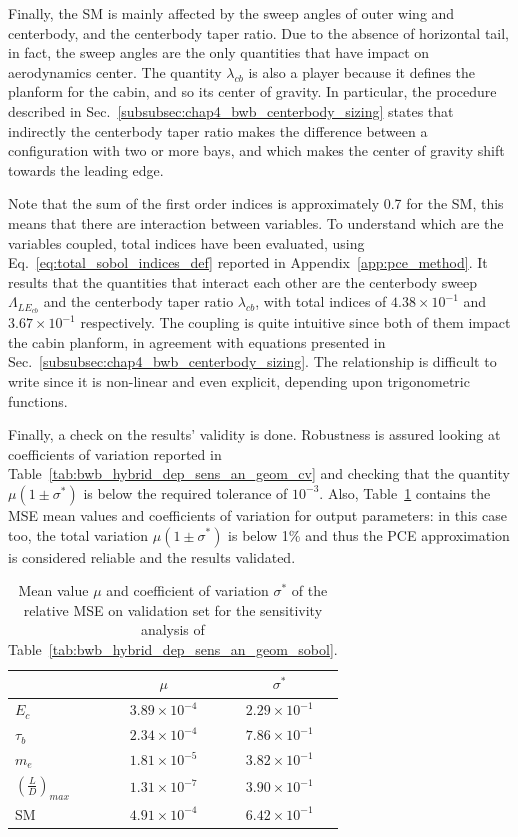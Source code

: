 Finally, the SM is mainly affected by the sweep angles of outer wing and centerbody, and the centerbody taper ratio. 
Due to the absence of horizontal tail, in fact, the sweep angles are the only quantities that have impact on aerodynamics center. 
The quantity $\lambda_{cb}$ is also a player because it defines the planform for the cabin, and so its center of gravity. 
In particular, the procedure described in Sec.~\ref{subsubsec:chap4_bwb_centerbody_sizing} states that indirectly the centerbody taper ratio makes the difference between a configuration with two or more bays, and which makes the center of gravity shift towards the leading edge. 

Note that the sum of the first order indices is approximately 0.7 for the SM, this means that there are interaction between variables. 
To understand which are the variables coupled, total indices have been evaluated, using Eq.~\eqref{eq:total_sobol_indices_def} reported in Appendix~\ref{app:pce_method}. 
It results that the quantities that interact each other are the centerbody sweep $\Lambda_{LE_{cb}}$ and the centerbody taper ratio $\lambda_{cb}$, with total indices of $4.38\times10^{-1}$ and $3.67\times10^{-1}$ respectively. 
The coupling is quite intuitive since both of them impact the cabin planform, in agreement with equations presented in Sec.~\ref{subsubsec:chap4_bwb_centerbody_sizing}. 
The relationship is difficult to write since it is non-linear and even explicit, depending upon trigonometric functions. 

Finally, a check on the results' validity is done.
Robustness is assured looking at coefficients of variation reported in Table~\ref{tab:bwb_hybrid_dep_sens_an_geom_cv} and checking that the quantity $\mu\left(1\pm\sigma^*\right)$ is below the required tolerance of $10^{-3}$.
Also, Table~\ref{tab:bwb_dep_sensitivity_analysis_mse} contains the MSE mean values and coefficients of variation for output parameters: in this case too, the total variation $\mu\left(1\pm\sigma^*\right)$ is below 1\% and thus the PCE approximation is considered reliable and the results validated.
\begin{table}[!h]
	\centering
	\begin{tabular}{l c c}
		\hline
		& $\mu$ & $\sigma^*$ \\
		\hline
		$E_{c}$ & $3.89\times10^{-4}$ & $2.29\times10^{-1}$ \\
		$\tau_{b}$ & $2.34\times10^{-4}$ & $7.86\times10^{-1}$ \\
		$m_e$ & $1.81\times10^{-5}$ & $3.82\times10^{-1}$ \\
		$\left(\frac{L}{D}\right)_{max}$ & $1.31\times10^{-7}$ & $3.90\times10^{-1}$ \\
		SM & $4.91\times10^{-4}$ & $6.42\times10^{-1}$ \\
		\hline
	\end{tabular}
	\caption{Mean value $\mu$ and coefficient of variation $\sigma^*$ of the relative MSE on validation set for the sensitivity analysis of Table~\ref{tab:bwb_hybrid_dep_sens_an_geom_sobol}.}
	\label{tab:bwb_dep_sensitivity_analysis_mse}
\end{table}

